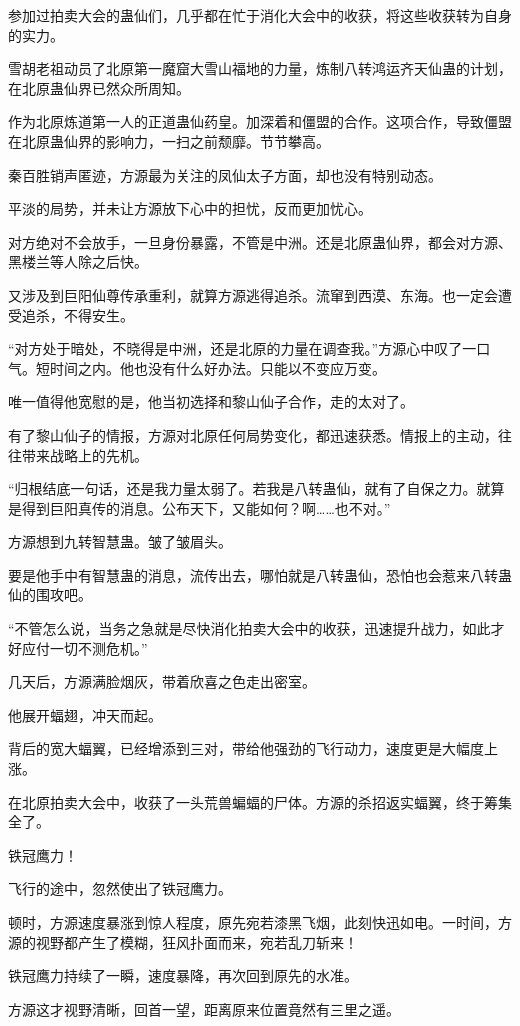 \begin{this_body}
参加过拍卖大会的蛊仙们，几乎都在忙于消化大会中的收获，将这些收获转为自身的实力。

雪胡老祖动员了北原第一魔窟大雪山福地的力量，炼制八转鸿运齐天仙蛊的计划，在北原蛊仙界已然众所周知。

作为北原炼道第一人的正道蛊仙药皇。加深着和僵盟的合作。这项合作，导致僵盟在北原蛊仙界的影响力，一扫之前颓靡。节节攀高。

秦百胜销声匿迹，方源最为关注的凤仙太子方面，却也没有特别动态。

平淡的局势，并未让方源放下心中的担忧，反而更加忧心。

对方绝对不会放手，一旦身份暴露，不管是中洲。还是北原蛊仙界，都会对方源、黑楼兰等人除之后快。

又涉及到巨阳仙尊传承重利，就算方源逃得追杀。流窜到西漠、东海。也一定会遭受追杀，不得安生。

“对方处于暗处，不晓得是中洲，还是北原的力量在调查我。”方源心中叹了一口气。短时间之内。他也没有什么好办法。只能以不变应万变。

唯一值得他宽慰的是，他当初选择和黎山仙子合作，走的太对了。

有了黎山仙子的情报，方源对北原任何局势变化，都迅速获悉。情报上的主动，往往带来战略上的先机。

“归根结底一句话，还是我力量太弱了。若我是八转蛊仙，就有了自保之力。就算是得到巨阳真传的消息。公布天下，又能如何？啊……也不对。”

方源想到九转智慧蛊。皱了皱眉头。

要是他手中有智慧蛊的消息，流传出去，哪怕就是八转蛊仙，恐怕也会惹来八转蛊仙的围攻吧。

“不管怎么说，当务之急就是尽快消化拍卖大会中的收获，迅速提升战力，如此才好应付一切不测危机。”

几天后，方源满脸烟灰，带着欣喜之色走出密室。

他展开蝠翅，冲天而起。

背后的宽大蝠翼，已经增添到三对，带给他强劲的飞行动力，速度更是大幅度上涨。

在北原拍卖大会中，收获了一头荒兽蝙蝠的尸体。方源的杀招返实蝠翼，终于筹集全了。

铁冠鹰力！

飞行的途中，忽然使出了铁冠鹰力。

顿时，方源速度暴涨到惊人程度，原先宛若漆黑飞烟，此刻快迅如电。一时间，方源的视野都产生了模糊，狂风扑面而来，宛若乱刀斩来！

铁冠鹰力持续了一瞬，速度暴降，再次回到原先的水准。

方源这才视野清晰，回首一望，距离原来位置竟然有三里之遥。


\end{this_body}
